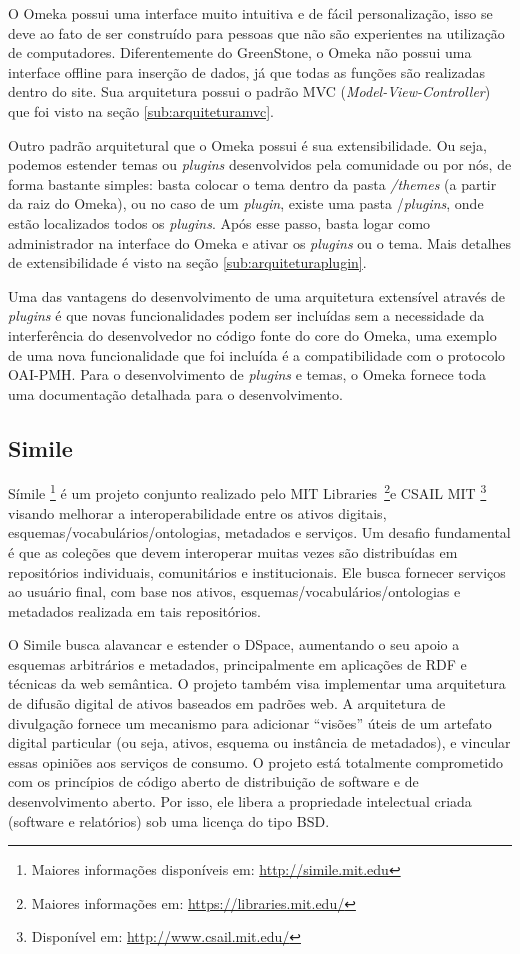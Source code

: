 O Omeka possui uma interface muito intuitiva e de fácil personalização, isso se deve ao fato de ser construído para pessoas que não são experientes na utilização de computadores. Diferentemente do GreenStone, o Omeka não possui uma interface offline para inserção de dados, já que todas as funções são realizadas dentro do site. Sua arquitetura possui o padrão MVC (\textit{Model-View-Controller}) que foi visto na seção \ref{sub:arquiteturamvc}.

Outro padrão arquitetural que o Omeka possui é sua extensibilidade. Ou seja, podemos estender temas ou \textit{plugins} desenvolvidos pela comunidade ou por nós, de forma bastante simples: basta colocar o tema dentro da pasta \textit{/themes} (a partir da raiz do Omeka), ou no caso de um \textit{plugin}, existe uma pasta /\textit{plugins}, onde estão localizados todos os \textit{plugins}. Após esse passo, basta logar como administrador na interface do Omeka e ativar os \textit{plugins} ou o tema. Mais detalhes de extensibilidade é visto na seção \ref{sub:arquiteturaplugin}.

Uma das vantagens do desenvolvimento de uma arquitetura extensível através de \textit{plugins} é que novas funcionalidades podem ser incluídas sem a necessidade da interferência do desenvolvedor no código fonte do core do Omeka, uma exemplo de uma nova funcionalidade que foi incluída é a compatibilidade com o protocolo OAI-PMH. Para o desenvolvimento de \textit{plugins} e temas, o Omeka fornece toda uma documentação detalhada para o desenvolvimento.

\subsection{Simile}

Símile \footnote{Maiores informações disponíveis em: \url{http://simile.mit.edu}} é um projeto conjunto realizado pelo MIT Libraries~\footnote{Maiores informações em: \url{https://libraries.mit.edu/}}e CSAIL MIT \footnote{Disponível em: \url{http://www.csail.mit.edu/}} visando melhorar a interoperabilidade entre os ativos digitais, esquemas/vocabulários/ontologias, metadados e serviços. Um desafio fundamental é que as coleções que devem interoperar muitas vezes são distribuídas em repositórios individuais, comunitários e institucionais. Ele busca fornecer serviços ao usuário final, com base nos ativos, esquemas/vocabulários/ontologias e metadados realizada em tais repositórios. 

O Simile busca alavancar e estender o DSpace, aumentando o seu apoio a esquemas arbitrários e metadados, principalmente em aplicações de RDF e técnicas da web semântica. O projeto também visa implementar uma arquitetura de difusão digital de ativos baseados em padrões web. A arquitetura de divulgação fornece um mecanismo para adicionar “visões” úteis de um artefato digital particular (ou seja, ativos, esquema ou instância de metadados), e vincular essas opiniões aos serviços de consumo. O projeto está totalmente comprometido com os princípios de código aberto de distribuição de software e de desenvolvimento aberto. Por isso, ele libera a propriedade intelectual criada (software e relatórios) sob uma licença do tipo BSD.
 
